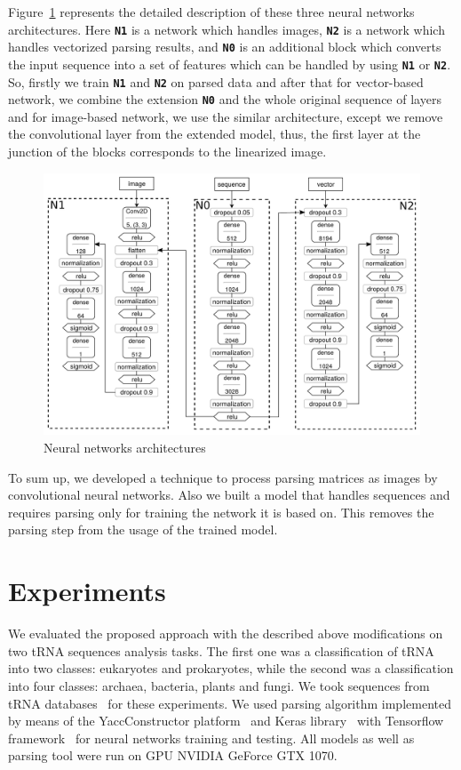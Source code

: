 \documentclass[runningheads]{llncs}
\begin{document}
Figure~\ref{nn} represents the detailed description of these three neural networks architectures.
Here \textbf{\texttt{N1}} is a network which handles images, \textbf{\texttt{N2}} is a network which handles vectorized parsing results, and \textbf{\texttt{N0}} is an additional block which converts the input sequence into a set of features which can be handled by using \textbf{\texttt{N1}} or \textbf{\texttt{N2}}. So, firstly we train \textbf{\texttt{N1}} and \textbf{\texttt{N2}} on parsed data and after that for vector-based network, we combine the extension \textbf{\texttt{N0}} and the whole original sequence of layers and for image-based network, we use the similar architecture, except we remove the convolutional layer from the extended model, thus, the first layer at the junction of the blocks corresponds to the linearized image.

\begin{figure}[h]
\begin{center}
\centering
\includegraphics[width=12cm]{figures/nn_arch.pdf}
\caption{Neural networks architectures}
\label{nn}
\end{center}
\end{figure}

To sum up, we developed a technique to process parsing matrices as images by convolutional neural networks. Also we built a model that handles sequences and requires parsing only for training the network it is based on. This removes the parsing step from the usage of the trained model.

\section{Experiments}
We evaluated the proposed approach with the described above modifications on two tRNA sequences analysis tasks.
The first one was a classification of tRNA into two classes: eukaryotes and prokaryotes, while the second was a classification into four classes: archaea, bacteria, plants and fungi.
We took sequences from tRNA databases~\cite{trnadb1,trnadb2} for these experiments. We used parsing algorithm implemented by means of the YaccConstructor platform~\cite{yaccconstructor} and Keras library~\cite{keras} with Tensorflow framework~\cite{tensorflow} for neural networks training and testing. All models as well as parsing tool were run on GPU NVIDIA GeForce GTX 1070.
\end{document}
